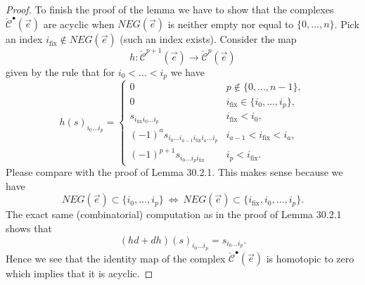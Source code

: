 \begin{proof}
To finish the proof of the lemma we have to show that the complexes $\check{\mathcal C}^{\bullet}(\vec e)$ are acyclic when $NEG(\vec e)$ is neither empty nor equal to $\{0,\ldots,n\}$. Pick an index $i_{\mathrm{fix}}\notin NEG(\vec e)$ (such an index exists). Consider the map
\[
h:\check{\mathcal C}^{p+1}(\vec e)\to\check{\mathcal C}^{p}(\vec e)
\]
given by the rule that for $i_0<\ldots<i_p$ we have
\[
h(s)_{i_0\ldots i_p}=\begin{cases}
0&p\notin\{0,\ldots,n-1\},\\
0&i_{\mathrm{fix}}\in\{i_0,\ldots,i_p\},\\
s_{i_{\mathrm{fix}}i_0\ldots i_p}&i_{\mathrm{fix}}<i_0,\\
(-1)^as_{i_0\ldots i_{a-1}i_{\mathrm{fix}}i_a\ldots i_p}&i_{a-1}<i_{\mathrm{fix}}<i_a,\\
(-1)^{p+1}s_{i_0\ldots i_pi_{\mathrm{fix}}}&i_p<i_{\mathrm{fix}}.
\end{cases}
\]
Please compare with the proof of Lemma 30.2.1. This makes sense because we have
\[
NEG(\vec e)\subset\{i_0,\ldots,i_p\}\ \Longleftrightarrow\
NEG(\vec e)\subset\{i_{\mathrm{fix}},i_0,\ldots,i_p\}.
\]
The exact same (combinatorial) computation as in the proof of Lemma 30.2.1 shows that
\[
(hd+dh)(s)_{i_0\ldots i_p}=s_{i_0\ldots i_p}.
\]
Hence we see that the identity map of the complex $\check{\mathcal C}^{\bullet}(\vec e)$ is homotopic to zero which implies that it is acyclic.
\end{proof}

